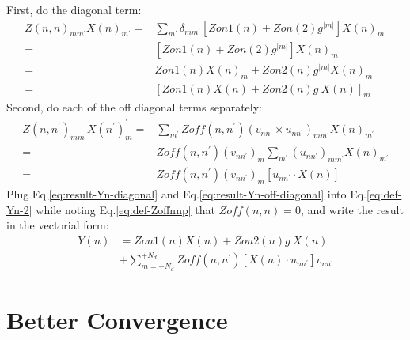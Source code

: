\documentclass [10pt,letterpaper]{article}
\begin{document}
First, do the diagonal term:
\begin{equation} \label{eq:result-Yn-diagonal}
	\begin{split}
		Z(n,n)_{m m^\prime}
		X(n)_{m^\prime}
		=&
		\sum\nolimits_{m^\prime}
		\delta_{m m^\prime}
		[ Zon1(n)+Zon(2)g^{\lvert m \rvert} ]
		X(n)_{m^\prime} 
		\\
		=&
		[ Zon1(n)+Zon(2)g^{\lvert m \rvert} ]
		X(n)_{m} 
		\\
		=&
		Zon1(n)X(n)_m
		+
		Zon2(n)g^{\lvert m \rvert} X(n)_m
		\\
		=&
		[Zon1(n)X(n)+Zon2(n)g\ X(n)]_m
	\end{split}
\end{equation}
Second, do each of the off diagonal terms separately:
\begin{equation} \label{eq:result-Yn-off-diagonal}
	\begin{split}
		Z(n,n^\prime)_{m m^\prime}
		X(n^\prime)_m^\prime
		=&
		\sum\nolimits_{m^\prime}
		Zoff(n,n^\prime)
		(
		v_{n n^\prime}
		\times
		u_{n n^\prime}
		)_{m m^\prime}
		X(n)_{m^\prime}
		\\
		=&
		Zoff(n,n^\prime)
		(v_{n n^\prime})_m
		\sum\nolimits_{m^\prime}
		(
		u_{n n^\prime}
		)_{m m^\prime}
		X(n)_{m^\prime} 
		\\
		=&
		Zoff(n,n^\prime)
		(v_{n n^\prime})_m
		[
			u_{n n^\prime}
			\cdot
			X(n)
		]
	\end{split}
\end{equation}
Plug Eq.\eqref{eq:result-Yn-diagonal} and Eq.\eqref{eq:result-Yn-off-diagonal} into Eq.\eqref{eq:def-Yn-2} while noting Eq.\eqref{eq:def-Zoffnnp} that $Zoff(n,n)=0$, and write the result in the vectorial form:
\begin{equation} \label{eq:result-Yn}
	\begin{split}
		Y(n)
		&= 
		Zon1(n) X(n)
		+
		Zon2(n) g\ X(n)
		\\
		&+
		\sum \nolimits_{m=-N_d}^{+N_d}
		Zoff(n,n^\prime)
		[ X(n)\cdot u_{n n^\prime} ]
		v_{n n^\prime}
	\end{split}
\end{equation}





\section{Better Convergence}
\label{sec:better-convergence}
\end{document}
